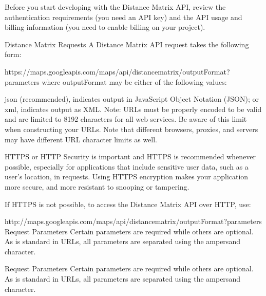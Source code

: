 Before you start developing with the Distance Matrix API, review the authentication requirements (you need an API key) and the API usage and billing information (you need to enable billing on your project).

Distance Matrix Requests
A Distance Matrix API request takes the following form:

https://maps.googleapis.com/maps/api/distancematrix/outputFormat?parameters
where outputFormat may be either of the following values:

json (recommended), indicates output in JavaScript Object Notation (JSON); or
xml, indicates output as XML.
Note: URLs must be properly encoded to be valid and are limited to 8192 characters for all web services. Be aware of this limit when constructing your URLs. Note that different browsers, proxies, and servers may have different URL character limits as well.

HTTPS or HTTP
Security is important and HTTPS is recommended whenever possible, especially for applications that include sensitive user data, such as a user's location, in requests. Using HTTPS encryption makes your application more secure, and more resistant to snooping or tampering.

If HTTPS is not possible, to access the Distance Matrix API over HTTP, use:

http://maps.googleapis.com/maps/api/distancematrix/outputFormat?parameters
Request Parameters
Certain parameters are required while others are optional. As is standard in URLs, all parameters are separated using the ampersand  character.

Request Parameters
Certain parameters are required while others are optional. As is standard in URLs, all parameters are separated using the ampersand character.

